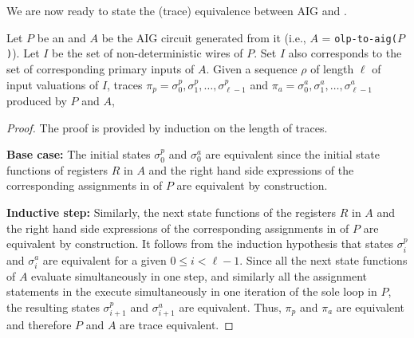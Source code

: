 %

We are now ready to state the (trace) equivalence between AIG and \caig.

\begin{theorem}
Let $P$ be an \caig and $A$ be the AIG circuit generated from it (i.e., $A$ = \texttt{olp-to-aig($P$)}). 
Let $I$ be the set of non-deterministic wires of $P$. 
Set $I$ also corresponds to the set of corresponding primary 
inputs of $A$. 
Given a sequence $\rho$ of length $\ell$ 
of input valuations of $I$, traces 
$\pi_p=\sigma^p_{0}, \sigma^p_{1}, \ldots, \sigma^p_{\ell-1}$ 
and 
$\pi_a=\sigma^a_{0}, \sigma^a_{1}, \ldots, \sigma^a_{\ell-1}$ 
produced by $P$ and $A$, 
\end{theorem}


\begin{proof}
The proof is provided by induction on the length of traces. 

{\bf Base case:} 
The initial states $\sigma^p_{0}$ and 
$\sigma^a_{0}$ are equivalent since the 
initial state functions of registers $R$ in $A$ and 
the right hand side expressions of the corresponding
assignments in  of $P$ are equivalent
by construction. 

{\bf Inductive step:} 
Similarly, the next state functions of the registers $R$ in $A$ 
and the right hand side expressions of the corresponding
assignments in  of $P$ are equivalent
by construction. 
It follows from the induction hypothesis 
that states $\sigma^p_{i}$ and $\sigma^a_{i}$ are 
equivalent for a given $0\le i < \ell -1$.
Since all the next state functions of $A$ 
evaluate simultaneously in one step,
and similarly all the assignment statements in the 
 execute simultaneously in one iteration of the 
sole loop in $P$, 
the resulting states $\sigma^p_{i+1}$ and $\sigma^a_{i+1}$ 
are equivalent. 
Thus, $\pi_p$ and $\pi_a$ are equivalent and therefore 
$P$ and $A$ are trace equivalent. 
\end{proof}

